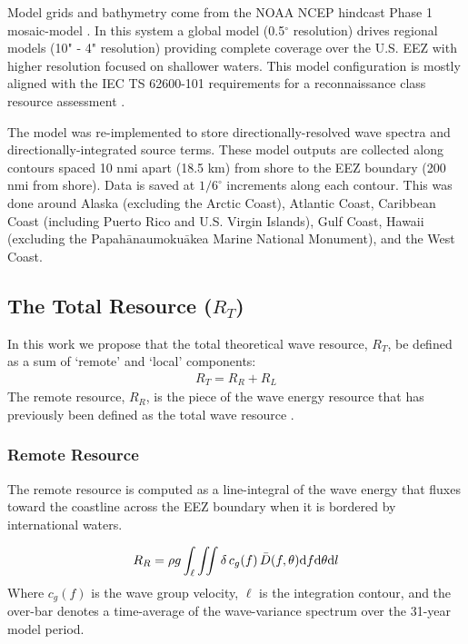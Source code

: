 Model grids and bathymetry come from the NOAA NCEP hindcast Phase 1 mosaic-model \citep{chawla2011wavewatch,chawla201230}. In this system a global model (0.5$^{\circ}$ resolution) drives regional models (10" - 4" resolution) providing complete coverage over the U.S. EEZ with higher resolution focused on shallower waters. This model configuration is mostly aligned with the IEC TS 62600-101 requirements for a reconnaissance class resource assessment \citep{internationalelectrotechnicalcommissionPart101Wave2015}. 

The model was re-implemented to store directionally-resolved wave spectra and directionally-integrated source terms. These model outputs are collected along contours spaced 10 nmi apart (18.5 km) from shore to the EEZ boundary (200 nmi from shore). Data is saved at $1/6^\circ$ increments along each contour. This was done around Alaska (excluding the Arctic Coast), Atlantic Coast, Caribbean Coast (including Puerto Rico and U.S. Virgin Islands), Gulf Coast, Hawaii (excluding the Papah$\bar{\text{a}}$naumoku$\bar{\text{a}}$kea Marine National Monument), and the West Coast. 

\subsection{The Total Resource ($R_T$) \label{sec:method:calc}}

In this work we propose that the total theoretical wave resource, $R_T$, be defined as a sum of `remote' and `local' components:
\begin{align}
  R_T = R_R + R_L
\end{align}
The remote resource, $R_R$, is the piece of the wave energy resource that has previously been defined as the total wave resource \citep{gunnQuantifyingGlobalWave2012,EPRIwaveresource2011}.%

\subsubsection{Remote Resource} \label{sec:method:calc:remote}

The remote resource is computed as a line-integral of the wave energy that fluxes toward the coastline across the EEZ boundary when it is bordered by international waters. 

\begin{align}
  R_R = \rho g \int_{\ell}\iint \delta \, c_g(f) \, \bar{D}(f,\theta) \mathrm{d} f \mathrm{d} \theta \mathrm{d} l
\label{eqn:RR}
\end{align}
Where $c_g(f)$ is the wave group velocity, $\ell$ is the integration contour, and
the over-bar denotes a time-average of the wave-variance spectrum over the 31-year model period.

